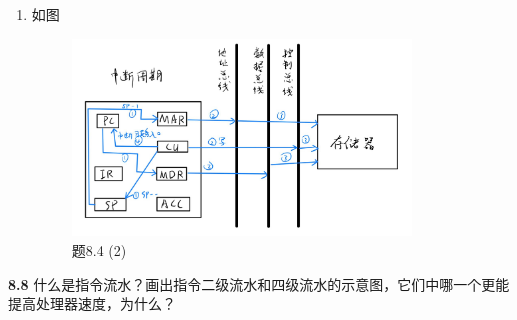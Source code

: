 \documentclass[UTF8]{report}
\newcommand{\problem}[1]{{\setlength{\parskip}{10pt}\noindent \bf{#1}}}
\newenvironment{solution}{{\noindent\hskip 2em \bf 解 \quad}}{}
\begin{document}
\begin{solution}
\begin{enumerate}[label=(\arabic*)]
        \item 如图

        \begin{figure}[!htbp]
            \centering
            \includegraphics[width=9cm]{fig/8.4_4.png}
            \caption{题8.4 (2)}
            \label{fig:8_4_4}
        \end{figure}
    \end{enumerate}
\end{solution}

\newpage
    
\problem{8.8} 什么是指令流水？画出指令二级流水和四级流水的示意图，它们中哪一个更能提高处理器速度，为什么？
\end{document}
